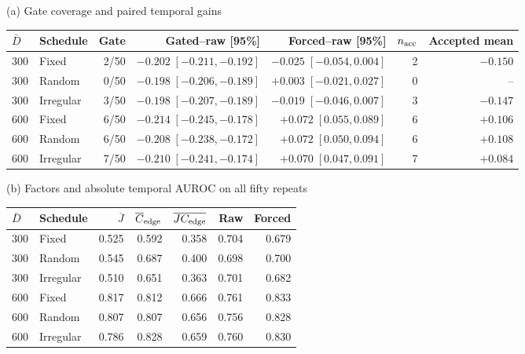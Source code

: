 \begin{minipage}{\linewidth}
\centering\small
(a) Gate coverage and paired temporal gains\par\medskip
\begin{tabular}{llrrrrr}
\toprule
$\bar D$ & Schedule & Gate & Gated--raw [95\%] & Forced--raw [95\%] & $n_{\rm acc}$ & Accepted mean \\
\midrule
300 & Fixed & 2/50 & $-0.202\;[-0.211,-0.192]$ & $-0.025\;[-0.054,0.004]$ & 2 & $-0.150$ \\
300 & Random & 0/50 & $-0.198\;[-0.206,-0.189]$ & $+0.003\;[-0.021,0.027]$ & 0 & -- \\
300 & Irregular & 3/50 & $-0.198\;[-0.207,-0.189]$ & $-0.019\;[-0.046,0.007]$ & 3 & $-0.147$ \\
600 & Fixed & 6/50 & $-0.214\;[-0.245,-0.178]$ & $+0.072\;[0.055,0.089]$ & 6 & $+0.106$ \\
600 & Random & 6/50 & $-0.208\;[-0.238,-0.172]$ & $+0.072\;[0.050,0.094]$ & 6 & $+0.108$ \\
600 & Irregular & 7/50 & $-0.210\;[-0.241,-0.174]$ & $+0.070\;[0.047,0.091]$ & 7 & $+0.084$ \\
\bottomrule
\end{tabular}
\par\bigskip
(b) Factors and absolute temporal AUROC on all fifty repeats\par\medskip
\begin{tabular}{llrrrrr}
\toprule
$\bar D$ & Schedule & $\overline J$ & $\overline C_{\rm edge}$ & $\overline{JC_{\rm edge}}$ & Raw & Forced \\
\midrule
300 & Fixed & 0.525 & 0.592 & 0.358 & 0.704 & 0.679 \\
300 & Random & 0.545 & 0.687 & 0.400 & 0.698 & 0.700 \\
300 & Irregular & 0.510 & 0.651 & 0.363 & 0.701 & 0.682 \\
600 & Fixed & 0.817 & 0.812 & 0.666 & 0.761 & 0.833 \\
600 & Random & 0.807 & 0.807 & 0.656 & 0.756 & 0.828 \\
600 & Irregular & 0.786 & 0.828 & 0.659 & 0.760 & 0.830 \\
\bottomrule
\end{tabular}
\end{minipage}
